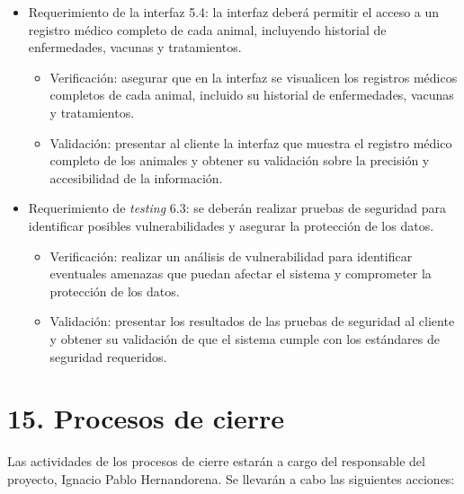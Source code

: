 \documentclass[
11pt, %
]{charter}
\begin{document}
\begin{itemize}
\item Requerimiento de la interfaz 5.4: la interfaz deberá permitir el acceso a un registro médico completo de cada animal,
incluyendo historial de enfermedades, vacunas y tratamientos.
\begin{itemize}
\item Verificación: asegurar que en la interfaz se visualicen los registros médicos completos de cada animal, incluido su historial de enfermedades, vacunas y tratamientos.
\item Validación: presentar al cliente la interfaz que muestra el registro médico completo de los animales y obtener su validación sobre la precisión y accesibilidad de la información.
\end{itemize}
\end{itemize}

\begin{itemize}
\item Requerimiento de \emph{testing} 6.3: se deberán realizar pruebas de seguridad para identificar posibles vulnerabilidades y
asegurar la protección de los datos.
\begin{itemize}
\item Verificación: realizar un análisis de vulnerabilidad para identificar eventuales amenazas que puedan afectar el sistema y comprometer la protección de los datos.
\item Validación: presentar los resultados de las pruebas de seguridad al cliente y obtener su validación de que el sistema cumple con los estándares de seguridad requeridos.
\end{itemize}
\end{itemize}

\section{15. Procesos de cierre}    
\label{sec:cierre}

Las actividades de los procesos de cierre estarán a cargo del responsable del proyecto, Ignacio Pablo Hernandorena. Se llevarán a cabo las siguientes acciones:
\end{document}
